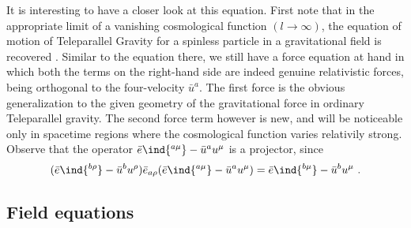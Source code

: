 \documentclass[11pt]{article}
\begin{document}
It is interesting to have a closer look at this equation. First 
note that in the appropriate limit of a vanishing cosmological 
function $(l \to \infty)$, the  equation of motion of 
Teleparallel Gravity for a spinless particle in a gravitational 
field is recovered \cite{aldrovandi:2012tele}. Similar to the 
equation there, we still have a force equation at hand in which 
both the terms on the right-hand side are indeed genuine 
relativistic forces, being orthogonal to the four-velocity 
$\bar{u}^a$. The first force is the obvious generalization to the 
given geometry of the gravitational force in ordinary 
Teleparallel gravity. The second force term however is new, and 
will be noticeable only in spacetime regions where the 
cosmological function varies relativily strong. Observe that the 
operator $\bar{e}\ind{^{a\mu}} - \bar{u}^a u^\mu$ is a projector, 
since
\begin{displaymath}
	(\bar{e}\ind{^{b\rho}} - \bar{u}^b u^\rho) \bar{e}_{a\rho} 
	(\bar{e}\ind{^{a\mu}} - \bar{u}^a u^\mu) = \bar{e}\ind{^{b\mu}} 
	- \bar{u}^b u^\mu~.
\end{displaymath}

\subsection{Field equations}
\end{document}
